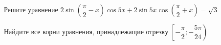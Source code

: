 \begin{ex}
	\begin{condition}
		\begin{enumcols}[label=\asbuk*)]
			\item Решите уравнение \(  2\sin{\left(\dfrac{\pi}{2}- x\right)}\cos 5x + 2\sin 5x \cos{\left(  \dfrac{\pi}{2} + x\right)}= \sqrt{3} \)
			\item Найдите все корни уравнения, принадлежащие отрезку \( \left[-\dfrac{\pi}{2};-\dfrac{5\pi}{24}\right) \)
		\end{enumcols}
	\end{condition}
\end{ex}